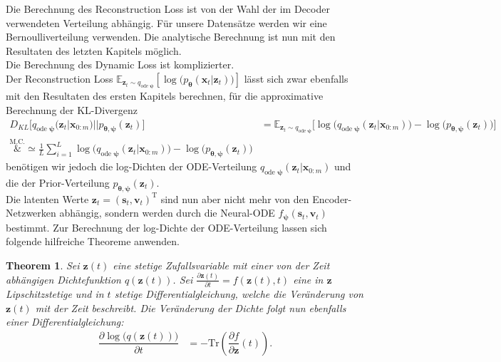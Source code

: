 \documentclass[12pt]{article}
\newcommand{\E}{\mathbb{E}}
\newtheorem{theorem}{Theorem}
\begin{document}
	Die Berechnung des Reconstruction Loss ist von der Wahl der im Decoder verwendeten Verteilung abhängig. Für unsere Datensätze werden wir eine Bernoulliverteilung verwenden.
	Die analytische Berechnung ist nun mit den Resultaten des letzten Kapitels möglich.\\
	Die Berechnung des Dynamic Loss ist komplizierter. \\
	Der Reconstruction Loss $\E_{\mathbf{z}_{t}\sim q_{\text{ode }\boldsymbol\psi}}
	\left[\log\big(p_{\boldsymbol\theta}\left(\mathbf{x}_{t}|\mathbf{z}_{t}\right)\big)\right] $ lässt sich zwar ebenfalls mit den Resultaten des ersten Kapitels berechnen, für die approximative Berechnung der KL-Divergenz
	\begin{align*}
	D_{KL}\big[q_{\text{ode }\boldsymbol\psi}(\mathbf{z}_{t}|\mathbf{x}_{0:m})||p_{\boldsymbol\theta,\boldsymbol\psi}(\mathbf{z}_{t})\big]
	&=\mathbb{E}_{\mathbf{z}_{t}\sim q_{\text{ode }\boldsymbol\psi}}\big[\log\big(q_{\text{ode }\boldsymbol\psi}(\mathbf{z}_{t}|\mathbf{x}_{0:m}) \big) - \log\big(p_{\boldsymbol\theta,\boldsymbol\psi}(\mathbf{z}_{t}) \big)\big] \\
	\overset{\text{M.C.}}&{\simeq} \frac{1}{L} \sum_{i=1}^{L} \log\big(q_{\text{ode }\boldsymbol\psi}(\mathbf{z}_{t}|\mathbf{x}_{0:m}) \big) - \log\big(p_{\boldsymbol\theta,\boldsymbol\psi}(\mathbf{z}_{t}) \big)
	\end{align*}
	benötigen wir jedoch die log-Dichten der ODE-Verteilung $q_{\text{ode }\boldsymbol\psi}(\mathbf{z}_{t}|\mathbf{x}_{0:m})$ und die der Prior-Verteilung $p_{\boldsymbol\theta,\boldsymbol\psi}(\mathbf{z}_{t})$.\\
	Die latenten Werte $\mathbf{z}_{t} = (\mathbf{s}_{t},\mathbf{v}_{t})^{\mathrm{T}}$ sind nun aber nicht mehr von den Encoder-Netzwerken abhängig, sondern werden durch die Neural-ODE $f_{\boldsymbol\psi}(\mathbf{s}_{t},\mathbf{v}_{t})$ bestimmt.
	Zur Berechnung der log-Dichte der ODE-Verteilung lassen sich folgende hilfreiche Theoreme anwenden.
	\begin{theorem}
		Sei $\mathbf{z}(t)$ eine stetige Zufallsvariable mit einer von der Zeit abhängigen Dichtefunktion $q(\mathbf{z}(t))$. Sei $\tfrac{\partial \mathbf{z}(t)}{\partial t}=f(\mathbf{z}(t),t)$ eine in $\mathbf{z}$ Lipschitzstetige und in $t$ stetige Differentialgleichung, welche die Veränderung von $\mathbf{z}(t)$ mit der Zeit beschreibt.
		Die Veränderung der Dichte folgt nun ebenfalls einer Differentialgleichung:
		\begin{align*}
		\dfrac{\partial \log\big(q(\mathbf{z}(t))\big)}{\partial t}&= - \mathrm{Tr}\left(\dfrac{\partial f}{\partial\mathbf{z}}(t)\right).
		\end{align*}
	\end{theorem}
\end{document}
